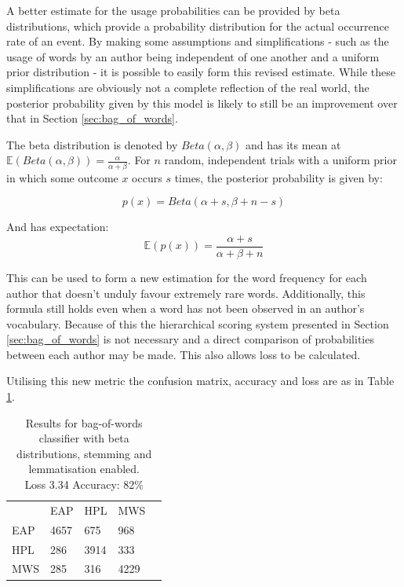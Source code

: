 A better estimate for the usage probabilities can be provided by beta distributions, which provide a probability distribution for the actual occurrence rate of an event. By making some assumptions and simplifications - such as the usage of words by an author being independent of one another and a uniform prior distribution - it is possible to easily form this revised estimate. While these simplifications are obviously not a complete reflection of the real world, the posterior probability given by this model is likely to still be an improvement over that in Section \ref{sec:bag_of_words}.

The beta distribution is denoted by $Beta(\alpha , \beta)$ and has its mean at $\mathbb{E}(Beta(\alpha, \beta)) = \frac{\alpha}{\alpha + \beta}$. For $n$ random, independent trials with a uniform prior in which some outcome $x$ occurs $s$ times, the posterior probability is given by:

\begin{equation*}
p(x) = Beta(\alpha + s, \beta + n - s)
\end{equation*}

And has expectation:
\begin{equation*}
\mathbb{E}(p(x)) = \frac{\alpha+s}{\alpha + \beta + n}
\end{equation*}

This can be used to form a new estimation for the word frequency for each author that doesn't unduly favour extremely rare words. Additionally, this formula still holds even when a word has not been observed in an author's vocabulary. Because of this the hierarchical scoring system presented in Section \ref{sec:bag_of_words} is not necessary and a direct comparison of probabilities between each author may be made. This also allows loss to be calculated.

Utilising this new metric the confusion matrix, accuracy and loss are as in Table \ref{tab:beta_res}.

\begin{table}[h]
\centering
\begin{tabular}{m{1cm}|m{1cm}|m{1cm}|m{1cm}|m{0cm}}
\multicolumn{1}{m{1cm}}{} & \multicolumn{1}{m{1cm}}{EAP} & \multicolumn{1}{m{1cm}}{HPL} & \multicolumn{1}{m{1cm}}{MWS} &\\[5pt]
\cline{2-4}
EAP & 4657 & 675 & 968 & \\[5pt]
\cline{2-4}
HPL & 286 & 3914 & 333 & \\[5pt]
\cline{2-4}
MWS & 285 & 316 & 4229 & \\[5pt]
\cline{2-4}
\end{tabular}
\caption{Results for bag-of-words classifier with beta distributions, stemming and lemmatisation enabled.\\Loss 3.34 Accuracy: 82\% }
\label{tab:beta_res}
\end{table}


